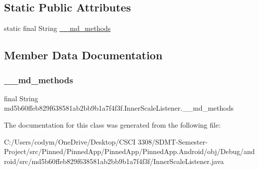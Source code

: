 \subsection*{Static Public Attributes}
\begin{DoxyCompactItemize}
\item 
static final String \hyperlink{classmd5b60ffeb829f638581ab2bb9b1a7f4f3f_1_1_inner_scale_listener_ae1c1d8dc7c8fd6e763b6ea898d8955fd}{\+\_\+\+\_\+md\+\_\+methods}
\end{DoxyCompactItemize}


\subsection{Member Data Documentation}
\mbox{\label{classmd5b60ffeb829f638581ab2bb9b1a7f4f3f_1_1_inner_scale_listener_ae1c1d8dc7c8fd6e763b6ea898d8955fd}} 
\subsubsection{\texorpdfstring{\+\_\+\+\_\+md\+\_\+methods}{\_\_md\_methods}}
{\footnotesize\ttfamily final String md5b60ffeb829f638581ab2bb9b1a7f4f3f.\+Inner\+Scale\+Listener.\+\_\+\+\_\+md\+\_\+methods\hspace{0.3cm}{\ttfamily [static]}}



The documentation for this class was generated from the following file\+:\begin{DoxyCompactItemize}
\item 
C\+:/\+Users/codym/\+One\+Drive/\+Desktop/\+C\+S\+C\+I 3308/\+S\+D\+M\+T-\/\+Semester-\/\+Project/src/\+Pinned/\+Pinned\+App/\+Pinned\+App/\+Pinned\+App.\+Android/obj/\+Debug/android/src/md5b60ffeb829f638581ab2bb9b1a7f4f3f/Inner\+Scale\+Listener.\+java\end{DoxyCompactItemize}

